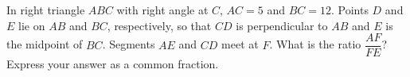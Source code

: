 In right triangle $ABC$ with right angle at $C$, $AC=5$ and $BC=12$. Points $D$ and $E$ lie on $AB$ and $BC$, respectively, so that $CD$ is perpendicular to $AB$ and $E$ is the midpoint of $BC$. Segments $AE$ and $CD$ meet at $F$. What is the ratio $\dfrac{AF}{FE}$? Express your answer as a common fraction.
